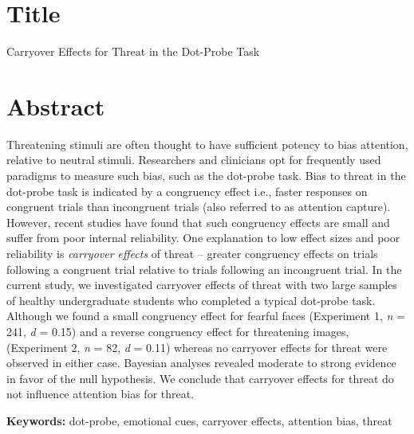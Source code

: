 \documentclass{article}
\begin{document}
	\section{Title}



	Carryover Effects for Threat in the Dot-Probe Task







	\section{Abstract}



	Threatening stimuli are often thought to have sufficient potency to bias attention, relative to neutral stimuli. Researchers and clinicians opt for frequently used paradigms to measure such bias, such as the dot-probe task. Bias to threat in the dot-probe task is indicated by a congruency effect i.e., faster responses on congruent trials than incongruent trials (also referred to as attention capture). However, recent studies have found that such congruency effects are small and suffer from poor internal reliability. One explanation to low effect sizes and poor reliability is \emph{carryover effects} of threat – greater congruency effects on trials following a congruent trial relative to trials following an incongruent trial. In the current study, we investigated carryover effects of threat with two large samples of healthy undergraduate students who completed a typical dot-probe task. Although we found a small congruency effect for fearful faces (Experiment 1, \emph{n} = 241, \emph{d }= 0.15) and a reverse congruency effect for threatening images, (Experiment 2, \emph{n }= 82, \emph{d }= 0.11) whereas no carryover effects for threat were observed in either case. Bayesian analyses revealed moderate to strong evidence in favor of the null hypothesis. We conclude that carryover effects for threat do not influence attention bias for threat.







	\textbf{Keywords:} dot-probe, emotional cues, carryover effects, attention bias, threat
\end{document}
